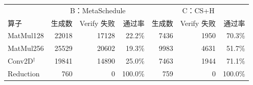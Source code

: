 \begin{tabular*}{\textwidth}{@{\extracolsep{\fill}}lrrrrrr@{}}
\toprule
 & \multicolumn{3}{c}{B：MetaSchedule} & \multicolumn{3}{c}{C：CS+H} \\
算子 & 生成数 & Verify 失败 & 通过率 & 生成数 & Verify 失败 & 通过率 \\
\midrule
MatMul128 & 22018 & 17128 & 22.2\% & 7436 & 1950 & 70.3\% \\
MatMul256 & 25529 & 20602 & 19.3\% & 9983 & 4631 & 51.7\% \\
Conv2D$^{\dagger}$ & 19841 & 14890 & 25.0\% & 7463 & 1944 & 71.1\% \\
Reduction & 760 & 0 & 100.0\% & 759 & 0 & 100.0\% \\
\bottomrule
\end{tabular*}
